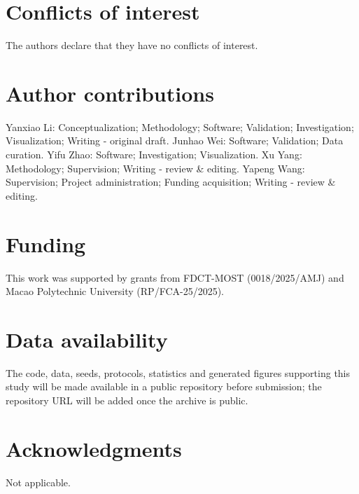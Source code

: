 \documentclass[12pt,a4paper]{article}
\renewcommand{\_}{\textunderscore\allowbreak}
\begin{document}







\FloatBarrier

\section*{Conflicts of interest}
The authors declare that they have no conflicts of interest.

\section*{Author contributions}
Yanxiao Li: Conceptualization; Methodology; Software; Validation; Investigation; Visualization;
Writing - original draft. Junhao Wei: Software; Validation; Data curation. Yifu Zhao: Software;
Investigation; Visualization. Xu Yang: Methodology; Supervision; Writing - review \& editing.
Yapeng Wang: Supervision; Project administration; Funding acquisition; Writing - review \& editing.

\section*{Funding}
This work was supported by grants from FDCT-MOST (0018/2025/AMJ) and Macao Polytechnic University
(RP/FCA-25/2025).

\section*{Data availability}
The code, data, seeds, protocols, statistics and generated figures supporting this study will be made
available in a public repository before submission; the repository URL will be added once the archive
is public.

\section*{Acknowledgments}
Not applicable.

\printbibliography
\end{document}
